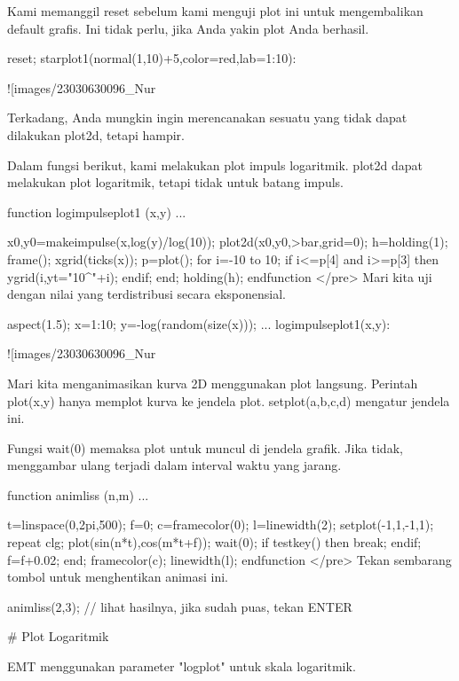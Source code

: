 \documentclass{article}
\begin{document}
Kami memanggil reset sebelum kami menguji plot ini untuk mengembalikan
default grafis. Ini tidak perlu, jika Anda yakin plot Anda berhasil.


\>reset; starplot1(normal(1,10)+5,color=red,lab=1:10):


![images/23030630096_Nur%

Terkadang, Anda mungkin ingin merencanakan sesuatu yang tidak dapat
dilakukan plot2d, tetapi hampir.


Dalam fungsi berikut, kami melakukan plot impuls logaritmik. plot2d
dapat melakukan plot logaritmik, tetapi tidak untuk batang impuls.


\>function logimpulseplot1 (x,y) ...


      {x0,y0}=makeimpulse(x,log(y)/log(10));
      plot2d(x0,y0,>bar,grid=0);
      h=holding(1);
      frame();
      xgrid(ticks(x));
      p=plot();
      for i=-10 to 10;
        if i<=p[4] and i>=p[3] then
           ygrid(i,yt="10^"+i);
        endif;
      end;
      holding(h);
    endfunction
</pre>
Mari kita uji dengan nilai yang terdistribusi secara eksponensial.


\>aspect(1.5); x=1:10; y=-log(random(size(x))); ...  
\>   logimpulseplot1(x,y):


![images/23030630096_Nur%

Mari kita menganimasikan kurva 2D menggunakan plot langsung. Perintah
plot(x,y) hanya memplot kurva ke jendela plot. setplot(a,b,c,d)
mengatur jendela ini.


Fungsi wait(0) memaksa plot untuk muncul di jendela grafik. Jika
tidak, menggambar ulang terjadi dalam interval waktu yang jarang.


\>function animliss (n,m) ...


    t=linspace(0,2pi,500);
    f=0;
    c=framecolor(0);
    l=linewidth(2);
    setplot(-1,1,-1,1);
    repeat
      clg;
      plot(sin(n*t),cos(m*t+f));
      wait(0);
      if testkey() then break; endif;
      f=f+0.02;
    end;
    framecolor(c);
    linewidth(l);
    endfunction
</pre>
Tekan sembarang tombol untuk menghentikan animasi ini.


\>animliss(2,3); // lihat hasilnya, jika sudah puas, tekan ENTER


# Plot Logaritmik

EMT menggunakan parameter "logplot" untuk skala logaritmik.
\end{document}
